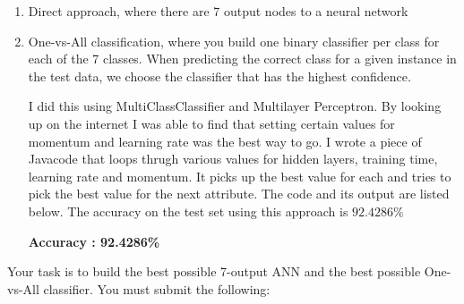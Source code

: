 \documentclass[fontsize=10pt,DIV=14]{scrartcl}
\begin{document}
	\begin{enumerate}
		\item
		Direct approach, where there are 7 output nodes to a neural network

		\item
		One-vs-All classiﬁcation, where you build one binary classiﬁer per class for each of the 7 classes. When predicting the correct class for a given instance in the test data, we choose the classiﬁer that has the highest conﬁdence.

		I did this using MultiClassClassifier and Multilayer Perceptron. By looking up on the internet I was able to find that setting certain values for momentum and learning rate was the best way to go. I wrote a piece of Javacode that loops thrugh various values for hidden layers, training time, learning rate and momentum. It picks up the best value for each and tries to pick the best value for the next attribute. The code and its output are listed below.
		The accuracy on the test set using this approach is $92.4286\%$

		\textbf{Accuracy : 92.4286\%}


	\end{enumerate}

	Your task is to build the best possible 7-output ANN and the best possible One-vs-All classiﬁer. You must submit the following:
\end{document}
